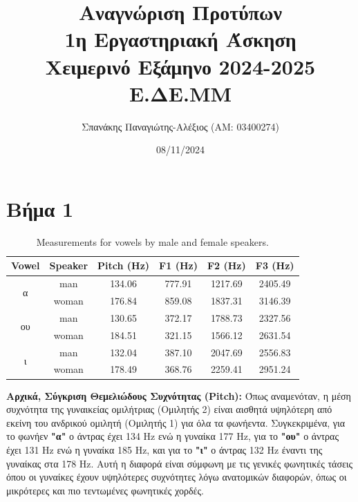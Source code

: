 \documentclass[a4paper,12pt]{article}
\title{Αναγνώριση Προτύπων \\ 1η Εργαστηριακή Άσκηση \\ Χειμερινό Εξάμηνο 2024-2025 \\ Ε.ΔE.ΜΜ}
\author{Σπανάκης Παναγιώτης-Αλέξιος (ΑΜ: 03400274) \\ }
\date{08/11/2024}
\begin{document}
\maketitle
\section*{Βήμα 1}

\begin{table}[h!]
    \centering
    \begin{tabular}{|c|c|c|c|c|c|}
        \hline
        \textbf{Vowel}      & \textbf{Speaker} & \textbf{Pitch (Hz)} & \textbf{F1 (Hz)} & \textbf{F2 (Hz)} & \textbf{F3 (Hz)} \\ \hline
        \multirow{2}{*}{α}  & man              & 134.06              & 777.91           & 1217.69          & 2405.49          \\ \cline{2-6}
                            & woman            & 176.84              & 859.08           & 1837.31          & 3146.39          \\ \hline
        \multirow{2}{*}{ου} & man              & 130.65              & 372.17           & 1788.73          & 2327.56          \\ \cline{2-6}
                            & woman            & 184.51              & 321.15           & 1566.12          & 2631.54          \\ \hline
        \multirow{2}{*}{ι}  & man              & 132.04              & 387.10           & 2047.69          & 2556.83          \\ \cline{2-6}
                            & woman            & 178.49              & 368.76           & 2259.41          & 2951.24          \\ \hline
    \end{tabular}
    \caption{Measurements for vowels by male and female speakers.}
    \label{tab:vowels}
\end{table}

\textbf{Αρχικά, Σύγκριση Θεμελιώδους Συχνότητας (Pitch):}
Όπως αναμενόταν, η μέση συχνότητα της γυναικείας ομιλήτριας (Ομιλητής 2) είναι αισθητά υψηλότερη από εκείνη του ανδρικού ομιλητή (Ομιλητής 1)
για όλα τα φωνήεντα. Συγκεκριμένα, για το φωνήεν \textbf{"α"} ο άντρας έχει 134 Hz ενώ η γυναίκα 177 Hz, για το \textbf{"ου"} ο
άντρας έχει 131 Hz ενώ η γυναίκα 185 Hz, και για το \textbf{"ι"} ο άντρας 132 Hz έναντι της γυναίκας στα 178 Hz.
Αυτή η διαφορά είναι σύμφωνη με τις γενικές φωνητικές τάσεις όπου οι γυναίκες έχουν υψηλότερες συχνότητες λόγω ανατομικών διαφορών,
όπως οι μικρότερες και πιο τεντωμένες φωνητικές χορδές.
\end{document}
